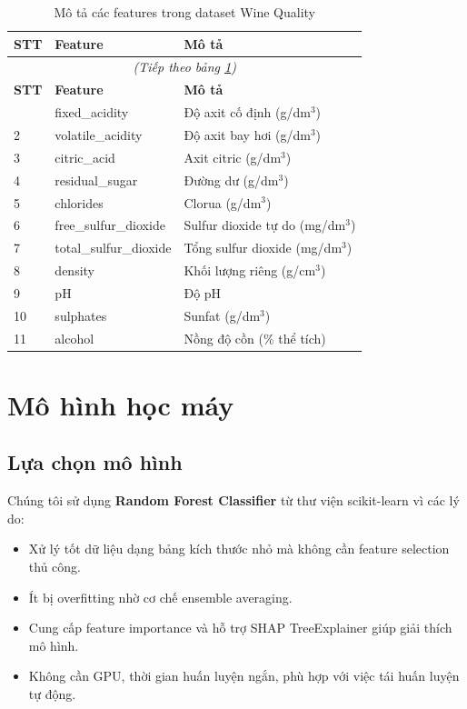 \documentclass[12pt,a4paper]{report}
\begin{document}
\begin{longtable}{lll}
  \caption{Mô tả các features trong dataset Wine Quality}
  \label{tab:features}\\
  \toprule
  \textbf{STT} & \textbf{Feature} & \textbf{Mô tả} \\
  \midrule
  \endfirsthead
  \multicolumn{3}{c}{\textit{(Tiếp theo bảng \ref{tab:features})}}\\
  \toprule
  \textbf{STT} & \textbf{Feature} & \textbf{Mô tả} \\
  \midrule
  \endhead
  \bottomrule
  \endfoot
  1  & fixed\_acidity          & Độ axit cố định (g/dm$^3$) \\
  2  & volatile\_acidity       & Độ axit bay hơi (g/dm$^3$) \\
  3  & citric\_acid            & Axit citric (g/dm$^3$) \\
  4  & residual\_sugar         & Đường dư (g/dm$^3$) \\
  5  & chlorides               & Clorua (g/dm$^3$) \\
  6  & free\_sulfur\_dioxide   & Sulfur dioxide tự do (mg/dm$^3$) \\
  7  & total\_sulfur\_dioxide  & Tổng sulfur dioxide (mg/dm$^3$) \\
  8  & density                 & Khối lượng riêng (g/cm$^3$) \\
  9  & pH                      & Độ pH \\
  10 & sulphates               & Sunfat (g/dm$^3$) \\
  11 & alcohol                 & Nồng độ cồn (\% thể tích) \\
\end{longtable}

\section{Mô hình học máy}

\subsection{Lựa chọn mô hình}

Chúng tôi sử dụng \textbf{Random Forest Classifier} từ thư viện scikit-learn vì các lý do:
\begin{itemize}
  \item Xử lý tốt dữ liệu dạng bảng kích thước nhỏ mà không cần feature selection thủ công.
  \item Ít bị overfitting nhờ cơ chế ensemble averaging.
  \item Cung cấp feature importance và hỗ trợ SHAP TreeExplainer giúp giải thích mô hình.
  \item Không cần GPU, thời gian huấn luyện ngắn, phù hợp với việc tái huấn luyện tự động.
\end{itemize}
\end{document}
